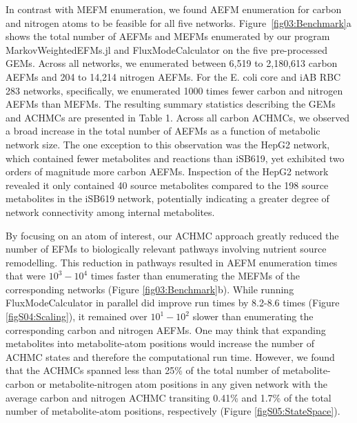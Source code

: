 \documentclass[12pt]{article}
\begin{document}
   
In contrast with MEFM enumeration, we found AEFM enumeration for carbon
and nitrogen atoms to be feasible for all five networks.
Figure~\ref{fig03:Benchmark}a shows the total number of AEFMs and MEFMs
enumerated by our program MarkovWeightedEFMs.jl and FluxModeCalculator on
the five pre-processed GEMs. Across all networks, we enumerated between
6,519 to 2,180,613 carbon AEFMs and 204 to 14,214 nitrogen AEFMs. For the
E. coli core and iAB RBC 283 networks, specifically, we enumerated 1000
times fewer carbon and nitrogen AEFMs than MEFMs. The resulting summary
statistics describing the GEMs and ACHMCs are presented in Table 1. Across
all carbon ACHMCs, we observed a broad increase in the total number of
AEFMs as a function of metabolic network size. The one exception to this
observation was the HepG2 network, which contained fewer metabolites and
reactions than iSB619, yet exhibited two orders of magnitude more carbon
AEFMs. Inspection of the HepG2 network revealed it only contained 40
source metabolites compared to the 198 source metabolites in the iSB619
network, potentially indicating a greater degree of network connectivity
among internal metabolites.

By focusing on an atom of interest, our ACHMC approach greatly reduced the
number of EFMs to biologically relevant pathways involving nutrient source
remodelling. This reduction in pathways resulted in AEFM enumeration times
that were $10^3-10^4$ times faster than enumerating the MEFMs of the
corresponding networks (Figure \ref{fig03:Benchmark}b). While running
FluxModeCalculator in parallel did improve run times by
8.2-8.6 times (Figure \ref{figS04:Scaling}), it remained over $10^1-10^2$
slower than enumerating the corresponding carbon and nitrogen AEFMs. One
may think that expanding metabolites into metabolite-atom positions would
increase the number of ACHMC states and therefore the computational run
time. However, we found that the ACHMCs spanned less than 25\% of the
total number of metabolite-carbon or metabolite-nitrogen atom positions in
any given network with the average carbon and nitrogen ACHMC transiting
0.41\% and 1.7\% of the total number of metabolite-atom positions,
respectively (Figure \ref{figS05:StateSpace}). 
\end{document}
